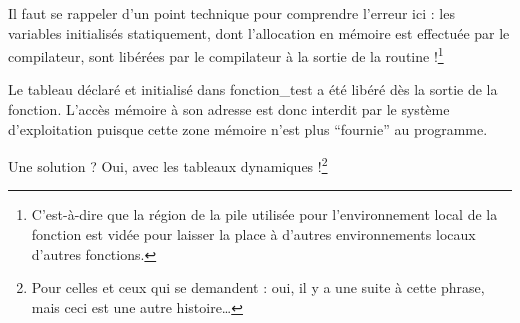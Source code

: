 \documentclass[../../../main.tex]{subfiles}
\begin{document}
Il faut se rappeler d'un point technique pour comprendre l'erreur ici : les variables initialisés statiquement, dont l'allocation en mémoire est effectuée par le compilateur, sont libérées par le compilateur à la sortie de la routine !\footnote{C'est-à-dire que la région de la pile utilisée pour l'environnement local de la fonction est vidée pour laisser la place à d'autres environnements locaux d'autres fonctions.}
 
Le tableau déclaré et initialisé dans \textsf{fonction\_test} a été libéré dès la sortie de la fonction. L'accès mémoire à son adresse est donc interdit par le système d'exploitation puisque cette zone mémoire n'est plus ``fournie'' au programme.
 
Une solution ? Oui, avec les tableaux dynamiques !\footnote{Pour celles et ceux qui se demandent : oui, il y a une suite à cette phrase, mais ceci est une autre histoire\dots}
\end{document}
